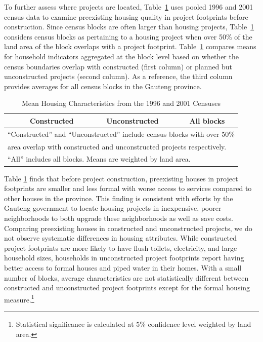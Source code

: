 \documentclass[12pt]{article}
\begin{document}
To further assess where projects are located, Table~\ref{table:projectdescriptivescensus} uses pooled 1996 and 2001 census data to examine preexisting housing quality in project footprints before construction.  Since census blocks are often larger than housing projects, Table~\ref{table:projectdescriptivescensus} considers census blocks as pertaining to a housing project when over 50\% of the land area of the block overlaps with a project footprint.  Table~\ref{table:projectdescriptivescensus} compares means for household indicators aggregated at the block level based on whether the census boundaries overlap with constructed (first column) or planned but unconstructed projects (second column).  As a reference, the third column provides averages for all census blocks in the Gauteng province.

\begin{table}[h!]
	\centering
	\caption{Mean Housing Characteristics from the 1996 and 2001 Censuses}\label{table:projectdescriptivescensus}
\vspace{-2mm}
\begin{tabular}{l*{1}{ccc}}
\toprule
& Constructed & Unconstructed & All blocks \\
\midrule
 
\bottomrule
\multicolumn{4}{l}{\scriptsize ``Constructed'' and ``Unconstructed'' include census blocks with over 50\% } \\ [-.5em]
\multicolumn{4}{l}{\scriptsize  area overlap with constructed and unconstructed projects respectively. } \\ [-.5em]
\multicolumn{4}{l}{\scriptsize ``All''  includes all blocks.  Means are weighted by land area.}
\end{tabular}
\end{table}


Table \ref{table:projectdescriptivescensus} finds that before project construction, preexisting houses in project footprints are smaller and less formal with worse access to services compared to other houses in the province.  This finding is consistent with efforts by the Gauteng government to locate housing projects in inexpensive, poorer neighborhoods to both upgrade these neighborhoods as well as save costs.  Comparing preexisting houses in constructed and unconstructed projects, we do not observe systematic differences in housing attributes.  While constructed project footprints are more likely to have flush toilets, electricity, and large household sizes, households in unconstructed project footprints report having better access to formal houses and piped water in their homes.  With a small number of blocks, average characteristics are not statistically different between constructed and unconstructed project footprints except for the formal housing measure.\footnote{Statistical significance is calculated at 5\% confidence level weighted by land area.}
\end{document}
